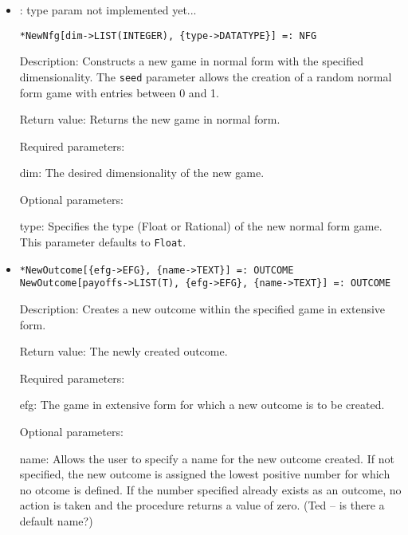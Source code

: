 \begin{itemize}
\item

: type param not implemented yet...
\protect \large \begin{verbatim}
*NewNfg[dim->LIST(INTEGER), {type->DATATYPE}] =: NFG
\end{verbatim}\normalsize

\bd
\item
[Description:] Constructs a new game in normal form with the
specified dimensionality.  The \verb+seed+ parameter allows the creation
of a random normal form game with entries between 0 and 1.

\item
[Return value:] Returns the new game in normal form.
\item
[Required parameters:]\hfil\null
	
\bd
\item
[dim:] The desired dimensionality of the new game.
\ed

\item
[Optional parameters:]\hfil\null
	
\bd
\item
[type:] Specifies the type (Float or Rational) of the new normal form
game.  This parameter defaults to \verb+Float+.
\ed

\ed

\item
\protect \large \begin{verbatim} 
*NewOutcome[{efg->EFG}, {name->TEXT}] =: OUTCOME
NewOutcome[payoffs->LIST(T), {efg->EFG}, {name->TEXT}] =: OUTCOME
\end{verbatim}\normalsize

\bd
\item
[Description:] Creates a new outcome within the specified game in
extensive form. 
\item
[Return value:] The newly created outcome. 
\item 
[Required parameters:]\hfil\null

\bd
\item
[efg:] The game in extensive form for which a new outcome is to be
created.
\ed

\item
[Optional parameters:]\hfil\null

\bd
\item
[name:] Allows the user to specify a name for the new outcome
created.  If not specified, the new outcome is assigned the lowest
positive number for which no otcome is defined.  If the number
specified already exists as an outcome, no action is taken and the
procedure returns a value of zero.  (Ted -- is there a default name?)
\ed
\ed


\end{itemize}
